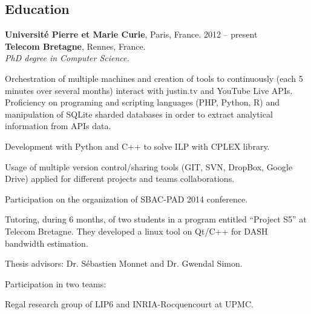\documentclass[margin,centered,10pt]{resume}
\begin{document}
\address{\small6 Rue Madeleine Brès, Apt 409, 75013, Paris $\bullet$ +33 7 87 16 72 62 $\bullet$ pires.karine@gmail.com $\bullet$ https://github.com/karinepires}
\begin{resume}

    \section{\mysidestyle Education}

    \textbf{Université Pierre et Marie Curie}, Paris, France.
    \hfill 2012 – present\\
    \textbf{Telecom Bretagne}, Rennes, France.    
    \\
    \textsl{PhD degree in Computer Science.}
    \vspace{-3mm}\\\vspace{-1mm}%
    \begin{list2}
        \item Orchestration of multiple machines and creation of tools to continuously (each 5 minutes over several months) interact with justin.tv and YouTube Live APIs. Proficiency on programing and scripting languages (PHP, Python, R) and manipulation of SQLite sharded databases in order to extract analytical information from APIs  data.
        \item Development with Python and C++ to solve ILP with CPLEX library.
        \item Usage of multiple version control/sharing tools (GIT, SVN, DropBox, Google Drive) applied for different projects and teams collaborations.
        \item Participation on the organization of SBAC-PAD 2014 conference.
        \item Tutoring, during 6 months, of two students in a program entitled “Project S5” at Telecom Bretagne. They developed a linux tool on Qt/C++ for DASH bandwidth estimation.
        \item Thesis advisors: Dr. Sébastien Monnet and Dr. Gwendal Simon. 
        \item Participation in two teams:
        \begin{list3}
        \item Regal research group of LIP6 and INRIA-Rocquencourt at UPMC.

\end{list3}
\end{list2}
\end{resume}
\end{document}
